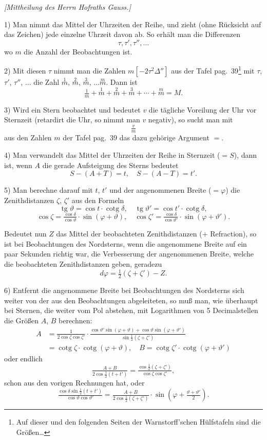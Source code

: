\documentclass[12pt,a4paper]{article}
\theoremstyle{plain}
\theoremstyle{definition}
\theoremstyle{remark}
\DeclareMathOperator{\tg}{tg}
\DeclareMathOperator{\cotg}{cotg}
\begin{document}
\emph{[Mittheilung des Herrn Hofraths Gauss.]}

1) Man nimmt das Mittel der Uhrzeiten der Reihe, und zieht (ohne R\"ucksicht auf das Zeichen) jede einzelne Uhrzeit davon ab. So erh\"alt man die Differenzen
\[
\tau, \tau', \tau'', \ldots
\]
wo $m$ die Anzahl der Beobachtungen ist.

2) Mit diesen $\tau$ nimmt man die Zahlen $m[-2\tau^2\Delta'']$ aus der Tafel pag.~39\footnote{Auf dieser und den folgenden Seiten der Warnstorff'schen H\"ulfstafeln sind die Gr\"o\ss en\ldots} mit $\tau$, $\tau'$, $\tau''$, $\ldots$ die Zahl $\overset{1}{m}$, $\overset{2}{m}$, $\overset{3}{m}$, $\ldots \overset{m}{m}$. Dann ist
\[
\tfrac{1}{m} + \overset{1}{m} + \overset{2}{m} + \overset{3}{m} + \cdots + \overset{m}{m} = M.
\]

3) Wird ein Stern beobachtet und bedeutet $v$ die t\"agliche Voreilung der Uhr vor Sternzeit (retardirt die Uhr, so nimmt man $v$ negativ), so sucht man mit
\[
\tfrac{v}{m}
\]
aus den Zahlen $m$ der Tafel pag.~39 das dazu geh\"orige Argument $=$.

4) Man verwandelt das Mittel der Uhrzeiten der Reihe in Sternzeit ($=S$), dann ist, wenn $A$ die gerade Aufsteigung des Sterns bedeutet
\[
S - (A + T) = t, \quad S - (A - T) = t'.
\]

5) Man berechne darauf mit $t$, $t'$ und der angenommenen Breite ($=\varphi$) die Zenithdistanzen $\zeta$, $\zeta'$ aus den Formeln
\[
\tg\vartheta = \cos t \cdot \cotg\delta, \quad \tg\vartheta' = \cos t' \cdot \cotg\delta,
\]
\[
\cos\zeta = \tfrac{\cos\delta}{\cos\vartheta} \cdot \sin(\varphi + \vartheta), \quad \cos\zeta' = \tfrac{\cos\delta}{\cos\vartheta'} \cdot \sin(\varphi + \vartheta').
\]

Bedeutet nun $Z$ das Mittel der beobachteten Zenithdistanzen ($+$ Refraction), so ist bei Beobachtungen des Nordsterns, wenn die angenommene Breite auf ein paar Sekunden richtig war, die Verbesserung der angenommenen Breite, welche die beobachteten Zenithdistanzen geben, geradezu
\[
d\varphi = \tfrac{1}{2}(\zeta + \zeta') - Z.
\]

6) Entfernt die angenommene Breite bei Beobachtungen des Nordsterns sich weiter von der aus den Beobachtungen abgeleiteten, so mu\ss{} man, wie \"uberhaupt bei Sternen, die weiter vom Pol abstehen, mit Logarithmen von 5 Decimalstellen die Gr\"o\ss en $A$, $B$ berechnen:
\begin{align*}
A &= \tfrac{1}{2\cos\zeta\cos\zeta'} \cdot \tfrac{\cos\vartheta'\sin(\varphi+\vartheta) + \cos\vartheta\sin(\varphi+\vartheta')}{\sin\tfrac{1}{2}(\zeta+\zeta')} \\
  &= \cotg\zeta \cdot \cotg(\varphi + \vartheta), \quad B = \cotg\zeta' \cdot \cotg(\varphi + \vartheta')
\end{align*}
oder endlich
\[
\tfrac{A+B}{2\cos\tfrac{1}{2}(t+t')} = \tfrac{\cos\tfrac{1}{2}(\zeta+\zeta')}{\cos\zeta\cos\zeta'},
\]
schon aus den vorigen Rechnungen hat, oder
\[
\tfrac{\cos\delta\sin\tfrac{1}{2}(t+t')}{\cos\vartheta\cos\vartheta'} = \tfrac{A+B}{2\cos\tfrac{1}{2}(\zeta+\zeta')} \cdot \sin(\varphi + \tfrac{\vartheta+\vartheta'}{2}).
\]
\end{document}
